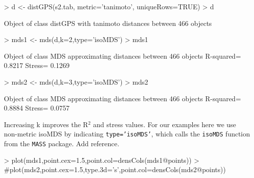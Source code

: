 \documentclass[a4paper,12pt,nogin]{article}
\newcommand{\newtext}[1]{{\color{blue} #1}} %
\newcommand{\drcomment}[1]{{\color{red} #1}} %
\begin{document}
\footnotesize
 
\begin{Schunk}
\begin{Sinput}
> d <- distGPS(s2.tab, metric='tanimoto', uniqueRows=TRUE)
> d
\end{Sinput}
\begin{Soutput}
Object of class distGPS with tanimoto distances between 466 objects 
\end{Soutput}
\begin{Sinput}
> mds1 <- mds(d,k=2,type='isoMDS')
> mds1
\end{Sinput}
\begin{Soutput}
Object of class MDS approximating distances between 466 objects 
R-squared= 0.8217 Stress= 0.1269 
\end{Soutput}
\begin{Sinput}
> mds2 <- mds(d,k=3,type='isoMDS')
> mds2
\end{Sinput}
\begin{Soutput}
Object of class MDS approximating distances between 466 objects 
R-squared= 0.8884 Stress= 0.0757 
\end{Soutput}
\end{Schunk}
 
\normalsize
 
Increasing k \newtext{improves the R$^2$ and stress values. 
For our examples here we use non-metric isoMDS by indicating \texttt{type='isoMDS'}, which calls}
the \texttt{isoMDS} function from the
\texttt{MASS} package.
\drcomment{Add reference.}

\footnotesize
 
\begin{Schunk}
\begin{Sinput}
> plot(mds1,point.cex=1.5,point.col=densCols(mds1@points))
> #plot(mds2,point.cex=1.5,type.3d='s',point.col=densCols(mds2@points))
\end{Sinput}
\end{Schunk}
 
\normalsize
 
\end{document}
